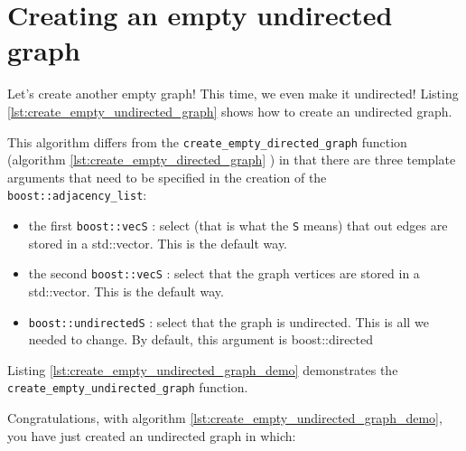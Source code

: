 \section{Creating an empty undirected graph}
\label{subsec:create_empty_undirected_graph}

Let's create another empty graph! This time, we even make it undirected!
Listing \ref{lst:create_empty_undirected_graph}
shows how to create an undirected graph.



This algorithm differs from the \verb;create_empty_directed_graph;
function (algorithm 
\ref{lst:create_empty_directed_graph}
) 
in that there are three template arguments that need to be specified in
the creation of the \verb;boost::adjacency_list;:

\begin{itemize}
  \item the first \verb;boost::vecS; : 
    select (that is what the \verb;S; 
    means) that out edges are stored in a std::vector.
    This is the default way.
  \item
    the second \verb;boost::vecS; : 
    select that the graph vertices are stored in a std::vector.
    This is the default way.
  \item
    \verb;boost::undirectedS; : 
    select that the graph is undirected.
    This is all we needed to change.
    By default, this argument is boost::directed 
\end{itemize}

Listing \ref{lst:create_empty_undirected_graph_demo}
demonstrates the \verb;create_empty_undirected_graph; function.



Congratulations, with algorithm \ref{lst:create_empty_undirected_graph_demo}, 
you have just created an undirected graph in which:

